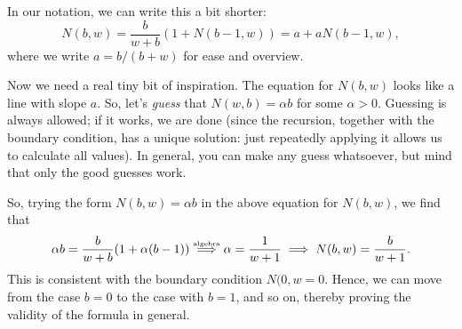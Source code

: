 \begin{exercise}
\begin{solution}
In our notation, we can write this a bit shorter:
\begin{equation}\label{eq:2}
N(b,w) = \frac{b}{w+b} (1+N(b-1, w)) = a + a N(b-1, w),
\end{equation}
where we write $a=b/(b+w)$ for ease and overview.


Now we need a real tiny bit of inspiration.
The equation for $N(b,w)$ looks like a line with slope $a$.
So, let's \emph{guess} that $N(w,b)=\alpha b$ for some $\alpha>0$.
Guessing is always allowed; if it works, we are done (since the recursion, together with the boundary condition, has a unique solution: just repeatedly applying it allows us to calculate all values).
In general, you can make any guess whatsoever, but mind that only the good guesses work.

So, trying the form $N(b, w) = \alpha b$ in the above equation for $N(b,w)$, we find that
\begin{equation*}
\alpha b = \frac{b}{w+b} (1+ \alpha (b-1)) \stackrel{\textrm{\tiny algebra}}{\implies} \alpha = \frac{1}{w+1} \implies  N(b,w) = \frac{b }{w+1}.
\end{equation*}
This is consistent with the boundary condition $N(0,w=0$. Hence, we can move from the case $b=0$ to the case with $b=1$, and so on, thereby proving the validity of the formula in general.
\end{solution}
\end{exercise}

